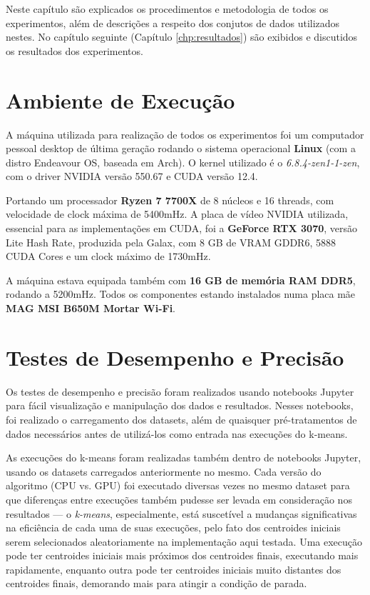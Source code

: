 \documentclass[12pt,
openright, 
oneside, %
a4paper,    %
brazil]{facom-ufu-abntex2}
\begin{document}
Neste capítulo são explicados os procedimentos e metodologia de todos os experimentos, além de descrições a respeito dos conjutos de dados utilizados nestes. No capítulo seguinte (Capítulo \ref{chp:resultados}) são exibidos e discutidos os resultados dos experimentos.




\section{Ambiente de Execução}
\label{sec:máquinaUtilizada}

A máquina utilizada para realização de todos os experimentos foi um computador pessoal desktop de última geração rodando o sistema operacional \textbf{Linux} (com a distro Endeavour OS, baseada em Arch). O kernel utilizado é o \textit{6.8.4-zen1-1-zen}, com o driver NVIDIA versão 550.67 e CUDA versão 12.4.

Portando um processador \textbf{Ryzen 7 7700X} de 8 núcleos e 16 threads, com velocidade de clock máxima de 5400mHz. A placa de vídeo NVIDIA utilizada, essencial para as implementações em CUDA, foi a \textbf{GeForce RTX 3070}, versão Lite Hash Rate, produzida pela Galax, com 8 GB de VRAM GDDR6, 5888 CUDA Cores e um clock máximo de 1730mHz.

A máquina estava equipada também com \textbf{16 GB de memória RAM DDR5}, rodando a 5200mHz. Todos os componentes estando instalados numa placa mãe \textbf{MAG MSI B650M Mortar Wi-Fi}.




\section{Testes de Desempenho e Precisão}

Os testes de desempenho e precisão foram realizados usando notebooks Jupyter para fácil visualização e manipulação dos dados e resultados. Nesses notebooks, foi realizado o carregamento dos datasets, além de quaisquer pré-tratamentos de dados necessários antes de utilizá-los como entrada nas execuções do k-means.

As execuções do k-means foram realizadas também dentro de notebooks Jupyter, usando os datasets carregados anteriormente no mesmo. Cada versão do algoritmo (CPU vs. GPU) foi executado diversas vezes no mesmo dataset para que diferenças entre execuções também pudesse ser levada em consideração nos resultados — o \textit{k-means}, especialmente, está suscetível a mudanças significativas na eficiência de cada uma de suas execuções, pelo fato dos centroides iniciais serem selecionados aleatoriamente na implementação aqui testada. Uma execução pode ter centroides iniciais mais próximos dos centroides finais, executando mais rapidamente, enquanto outra pode ter centroides iniciais muito distantes dos centroides finais, demorando mais para atingir a condição de parada.
\end{document}
